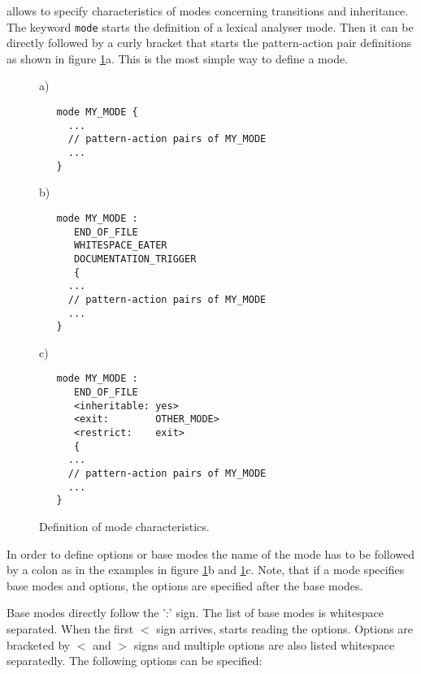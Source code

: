 {\Quex} allows to specify characteristics of modes concerning 
transitions and inheritance. The keyword {\tt mode} starts the
definition of a lexical analyser mode. Then it can be directly followed by a
curly bracket that starts the pattern-action pair definitions as shown in
figure \ref{fig:formal-mode-definition}a. This is the most simple way to
define a mode.

\begin{figure}[htbp] \leavevmode
      a)
      \begin{center} 
        \begin{lstlisting}
   mode MY_MODE {
     ...
     // pattern-action pairs of MY_MODE
     ...
   }          
        \end{lstlisting}
      \end{center} 

      b)
    \begin{center}
        \begin{lstlisting}
   mode MY_MODE :
      END_OF_FILE
      WHITESPACE_EATER
      DOCUMENTATION_TRIGGER
      {
     ...
     // pattern-action pairs of MY_MODE
     ...
   }          
        \end{lstlisting}
    \end{center} 

      c)
    \begin{center}
        \begin{lstlisting}
   mode MY_MODE :
      END_OF_FILE
      <inheritable: yes>
      <exit:        OTHER_MODE>      
      <restrict:    exit>
      {
     ...
     // pattern-action pairs of MY_MODE
     ...
   }          
        \end{lstlisting}
    \end{center} 
  \caption{Definition of mode characteristics.} 
  \label{fig:formal-mode-definition}
\end{figure}

In order to define options or base modes the name of the mode has to be
followed by a colon as in the examples in figure
\ref{fig:formal-mode-definition}b and \ref{fig:formal-mode-definition}c.
Note, that if a mode specifies base modes and options, the options are
specified after the base modes. 

Base modes directly follow the ':' sign. The list of base modes is whitespace
separated. When the first $<$ sign arrives, {\quex} starts reading the
options. Options are bracketed by $<$ and $>$ signs and multiple options 
are also listed whitespace separatedly. The following options can be
specified:

